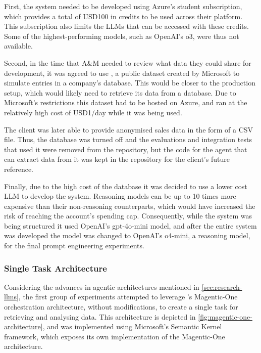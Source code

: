 \documentclass[a4paper]{report}
\begin{document}
First, the system needed to be developed using Azure's student subscription, which provides a total of USD100 in credits to be used across their platform. This subscription also limits the LLMs that can be accessed with these credits. Some of the highest-performing models, such as OpenAI's o3, were thus not available.

Second, in the time that A\&M needed to review what data they could share for development, it was agreed to use \cite{wideworldimporters2025}, a public dataset created by Microsoft to simulate entries in a company's database. This would be closer to the production setup, which would likely need to retrieve its data from a database. Due to Microsoft's restrictions this dataset had to be hosted on Azure, and ran at the relatively high cost of USD1/day while it was being used.

The client was later able to provide anonymised sales data in the form of a CSV file. Thus, the database was turned off and the evaluations and integration tests that used it were removed from the repository, but the code for the agent that can extract data from it was kept in the repository for the client's future reference.

Finally, due to the high cost of the database it was decided to use a lower cost LLM to develop the system. Reasoning models can be up to 10 times more expensive than their non-reasoning counterparts, which would have increased the risk of reaching the account's spending cap. Consequently, while the system was being structured it used OpenAI's gpt-4o-mini model, and after the entire system was developed the model was changed to OpenAI's o4-mini, a reasoning model, for the final prompt engineering experiments.

\subsubsection{Single Task Architecture}

Considering the advances in agentic architectures mentioned in \autoref{sec:research-llms}, the first group of experiments attempted to leverage \cite{fourney2024magenticone}'s Magentic-One orchestration architecture, without modifications, to create a single task for retrieving and analysing data. This architecture is depicted in \autoref{fig:magentic-one-architecture}, and was implemented using Microsoft's Semantic Kernel framework, which exposes its own implementation of the Magentic-One architecture.
\end{document}
